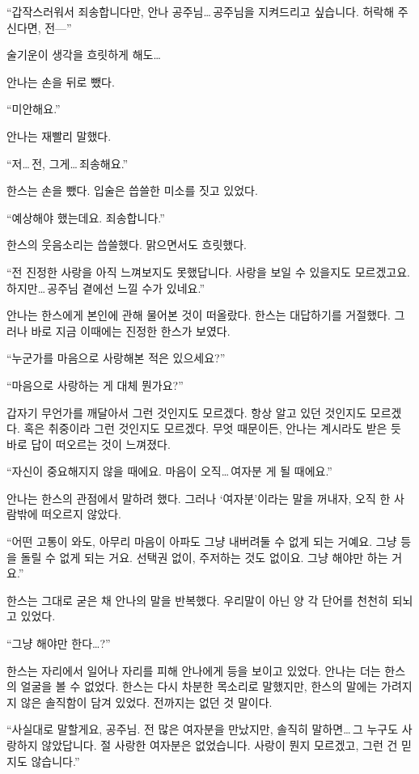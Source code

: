 ``갑작스러워서 죄송합니다만, 안나 공주님\ldots\,공주님을 지켜드리고 싶습니다. 허락해 주신다면, 전—''

술기운이 생각을 흐릿하게 해도\ldots

안나는 손을 뒤로 뺐다.

``미안해요.''

안나는 재빨리 말했다.

``저\ldots\,전, 그게\ldots\,죄송해요.''

한스는 손을 뺐다. 입술은 씁쓸한 미소를 짓고 있었다.

``예상해야 했는데요. 죄송합니다.''

한스의 웃음소리는 씁쓸했다. 맑으면서도 흐릿했다.

``전 진정한 사랑을 아직 느껴보지도 못했답니다. 사랑을 보일 수 있을지도 모르겠고요. 하지만\ldots\,공주님 곁에선 느낄 수가 있네요.''

안나는 한스에게 본인에 관해 물어본 것이 떠올랐다. 한스는 대답하기를 거절했다. 그러나 바로 지금 이때에는 진정한 한스가 보였다.

``누군가를 마음으로 사랑해본 적은 있으세요?''

``마음으로 사랑하는 게 대체 뭔가요?''

갑자기 무언가를 깨달아서 그런 것인지도 모르겠다. 항상 알고 있던 것인지도 모르겠다. 혹은 취중이라 그런 것인지도 모르겠다. 무엇 때문이든, 안나는 계시라도 받은 듯 바로 답이 떠오르는 것이 느껴졌다.

``자신이 중요해지지 않을 때에요. 마음이 오직\ldots\,여자분 게 될 때에요.''

안나는 한스의 관점에서 말하려 했다. 그러나 `여자분'이라는 말을 꺼내자, 오직 한 사람밖에 떠오르지 않았다.

``어떤 고통이 와도, 아무리 마음이 아파도 그냥 내버려둘 수 없게 되는 거예요. 그냥 등을 돌릴 수 없게 되는 거요. 선택권 없이, 주저하는 것도 없이요. 그냥 해야만 하는 거요.''

한스는 그대로 굳은 채 안나의 말을 반복했다. 우리말이 아닌 양 각 단어를 천천히 되뇌고 있었다.

``그냥 해야만 한다\ldots?''

한스는 자리에서 일어나 자리를 피해 안나에게 등을 보이고 있었다. 안나는 더는 한스의 얼굴을 볼 수 없었다. 한스는 다시 차분한 목소리로 말했지만, 한스의 말에는 가려지지 않은 솔직함이 담겨 있었다. 전까지는 없던 것 말이다.

``사실대로 말할게요, 공주님. 전 많은 여자분을 만났지만, 솔직히 말하면\ldots\,그 누구도 사랑하지 않았답니다. 절 사랑한 여자분은 없었습니다. 사랑이 뭔지 모르겠고, 그런 건 믿지도 않습니다.''


